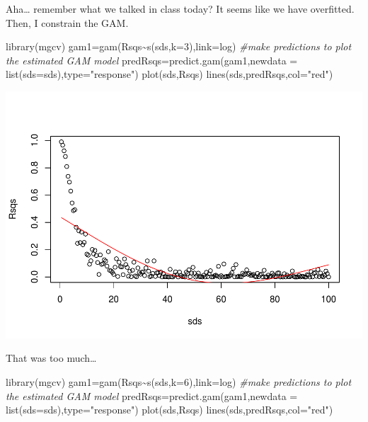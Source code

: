 \documentclass[
]{book}
\newenvironment{Shaded}{\begin{snugshade}}{\end{snugshade}}
\newcommand{\AttributeTok}[1]{\textcolor[rgb]{0.77,0.63,0.00}{#1}}
\newcommand{\CommentTok}[1]{\textcolor[rgb]{0.56,0.35,0.01}{\textit{#1}}}
\newcommand{\DecValTok}[1]{\textcolor[rgb]{0.00,0.00,0.81}{#1}}
\newcommand{\FunctionTok}[1]{\textcolor[rgb]{0.00,0.00,0.00}{#1}}
\newcommand{\NormalTok}[1]{#1}
\newcommand{\OtherTok}[1]{\textcolor[rgb]{0.56,0.35,0.01}{#1}}
\newcommand{\SpecialCharTok}[1]{\textcolor[rgb]{0.00,0.00,0.00}{#1}}
\newcommand{\StringTok}[1]{\textcolor[rgb]{0.31,0.60,0.02}{#1}}
\begin{document}
Aha\ldots{} remember what we talked in class today? It seems like we have overfitted. Then, I constrain the GAM.

\begin{Shaded}
\begin{Highlighting}[]
\FunctionTok{library}\NormalTok{(mgcv)}
\NormalTok{gam1}\OtherTok{=}\FunctionTok{gam}\NormalTok{(Rsqs}\SpecialCharTok{\textasciitilde{}}\FunctionTok{s}\NormalTok{(sds,}\AttributeTok{k=}\DecValTok{3}\NormalTok{),}\AttributeTok{link=}\NormalTok{log)}
\CommentTok{\#make predictions to plot the estimated GAM model}
\NormalTok{predRsqs}\OtherTok{=}\FunctionTok{predict.gam}\NormalTok{(gam1,}\AttributeTok{newdata =} \FunctionTok{list}\NormalTok{(}\AttributeTok{sds=}\NormalTok{sds),}\AttributeTok{type=}\StringTok{"response"}\NormalTok{)}
\FunctionTok{plot}\NormalTok{(sds,Rsqs)}
\FunctionTok{lines}\NormalTok{(sds,predRsqs,}\AttributeTok{col=}\StringTok{"red"}\NormalTok{)}
\end{Highlighting}
\end{Shaded}

\includegraphics{ECOMODbook_files/figure-latex/a6.33-1.pdf}

That was too much\ldots{}

\begin{Shaded}
\begin{Highlighting}[]
\FunctionTok{library}\NormalTok{(mgcv)}
\NormalTok{gam1}\OtherTok{=}\FunctionTok{gam}\NormalTok{(Rsqs}\SpecialCharTok{\textasciitilde{}}\FunctionTok{s}\NormalTok{(sds,}\AttributeTok{k=}\DecValTok{6}\NormalTok{),}\AttributeTok{link=}\NormalTok{log)}
\CommentTok{\#make predictions to plot the estimated GAM model}
\NormalTok{predRsqs}\OtherTok{=}\FunctionTok{predict.gam}\NormalTok{(gam1,}\AttributeTok{newdata =} \FunctionTok{list}\NormalTok{(}\AttributeTok{sds=}\NormalTok{sds),}\AttributeTok{type=}\StringTok{"response"}\NormalTok{)}
\FunctionTok{plot}\NormalTok{(sds,Rsqs)}
\FunctionTok{lines}\NormalTok{(sds,predRsqs,}\AttributeTok{col=}\StringTok{"red"}\NormalTok{)}
\end{Highlighting}
\end{Shaded}
\end{document}
